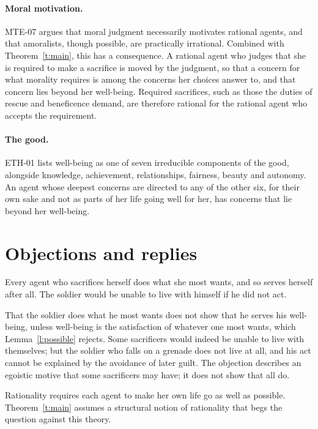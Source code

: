 \documentclass{situationist-preprint}
\begin{document}
\paragraph{Moral motivation.} MTE-07 argues that moral judgment necessarily motivates rational agents, and that amoralists, though possible, are practically irrational. Combined with Theorem~\ref{t:main}, this has a consequence. A rational agent who judges that she is required to make a sacrifice is moved by the judgment, so that a concern for what morality requires is among the concerns her choices answer to, and that concern lies beyond her well-being. Required sacrifices, such as those the duties of rescue and beneficence demand, are therefore rational for the rational agent who accepts the requirement.

\paragraph{The good.} ETH-01 lists well-being as one of seven irreducible components of the good, alongside knowledge, achievement, relationships, fairness, beauty and autonomy. An agent whose deepest concerns are directed to any of the other six, for their own sake and not as parts of her life going well for her, has concerns that lie beyond her well-being.

\section{Objections and replies}

\begin{objection}\label{o:egoism}
Every agent who sacrifices herself does what she most wants, and so serves herself after all. The soldier would be unable to live with himself if he did not act.
\end{objection}

\begin{reply}
That the soldier does what he most wants does not show that he serves his well-being, unless well-being is the satisfaction of whatever one most wants, which Lemma~\ref{l:possible} rejects. Some sacrificers would indeed be unable to live with themselves; but the soldier who falls on a grenade does not live at all, and his act cannot be explained by the avoidance of later guilt. The objection describes an egoistic motive that some sacrificers may have; it does not show that all do.
\end{reply}

\begin{objection}\label{o:si}
Rationality requires each agent to make her own life go as well as possible. Theorem~\ref{t:main} assumes a structural notion of rationality that begs the question against this theory.
\end{objection}
\end{document}
